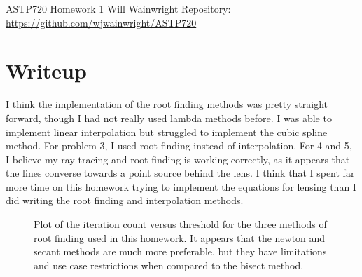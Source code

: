\documentclass[twocolumn,11pt]{article}
\begin{document}
\pagestyle{plain}
\onecolumn
ASTP720 
\newline Homework 1
\newline Will Wainwright
\newline Repository: \href{https://github.com/wjwainwright/ASTP720}{https://github.com/wjwainwright/ASTP720}

\section*{Writeup}
I think the implementation of the root finding methods was pretty straight forward, though I had not really used lambda methods before. I was able to implement linear interpolation but struggled to implement the cubic spline method. For problem 3, I used root finding instead of interpolation. For 4 and 5, I believe my ray tracing and root finding is working correctly, as it appears that the lines converse towards a point source behind the lens. I think that I spent far more time on this homework trying to implement the equations for lensing than I did writing the root finding and interpolation methods.

\begin{figure}[!h]
	\centering
	\noindent
      \caption{Plot of the iteration count versus threshold for the three methods of root finding used in this homework. It appears that the newton and secant methods are much more preferable, but they have limitations and use case restrictions when compared to the bisect method.}
\end{figure}
\end{document}

